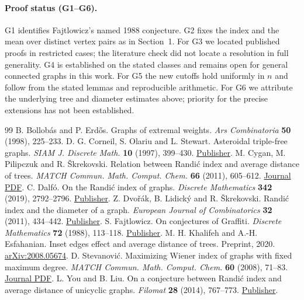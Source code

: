 \documentclass[11pt,a4paper]{article}
\begin{document}
\paragraph{Proof status (G1--G6).}
G1 identifies Fajtlowicz's named 1988 conjecture. G2 fixes the index and
the mean over distinct vertex pairs as in Section~1. For G3 we located
published proofs in restricted cases; the literature check did not locate
a resolution in full generality. G4 is established on the stated classes
and remains open for general connected graphs in this work. For G5 the
new cutoffs hold uniformly in $n$ and follow from the stated lemmas and
reproducible arithmetic. For G6 we attribute the underlying tree and
diameter estimates above; priority for the precise extensions has not
been established.
\begin{thebibliography}{99}
 B. Bollob\'as and P. Erd\H{o}s. Graphs of extremal weights.
\emph{Ars Combinatoria} \textbf{50} (1998), 225--233.
 D. G. Corneil, S. Olariu and L. Stewart.
Asteroidal triple-free graphs. \emph{SIAM J. Discrete Math.}
\textbf{10} (1997), 399--430.
\href{https://doi.org/10.1137/S0895480193250125}{Publisher}.
 M. Cygan, M. Pilipczuk and R. \v{S}krekovski.
Relation between Randi\'c index and average distance of trees.
\emph{MATCH Commun. Math. Comput. Chem.} \textbf{66} (2011), 605--612.
\href{https://match.pmf.kg.ac.rs/electronic_versions/Match66/n2/match66n2_605-612.pdf}{Journal PDF}.
 C. Dalf\'o. On the Randi\'c index of graphs.
\emph{Discrete Mathematics} \textbf{342} (2019), 2792--2796.
\href{https://doi.org/10.1016/j.disc.2018.08.020}{Publisher}.
 Z. Dvo\v{r}\'ak, B. Lidick\'y and R. \v{S}krekovski.
Randi\'c index and the diameter of a graph.
\emph{European Journal of Combinatorics} \textbf{32} (2011), 434--442.
\href{https://doi.org/10.1016/j.ejc.2010.12.002}{Publisher}.
 S. Fajtlowicz. On conjectures of Graffiti.
\emph{Discrete Mathematics} \textbf{72} (1988), 113--118.
\href{https://doi.org/10.1016/0012-365X(88)90199-9}{Publisher}.
 M. H. Khalifeh and A.-H. Esfahanian. Inset edges effect and
average distance of trees. Preprint, 2020.
\href{https://arxiv.org/abs/2008.05674}{arXiv:2008.05674}.
 D. Stevanovi\'c. Maximizing Wiener index of graphs with fixed
maximum degree. \emph{MATCH Commun. Math. Comput. Chem.} \textbf{60}
(2008), 71--83.
\href{https://match.pmf.kg.ac.rs/electronic_versions/Match60/n1/match60n1_71-83.pdf}{Journal PDF}.
 L. You and B. Liu. On a conjecture between Randi\'c index
and average distance of unicyclic graphs. \emph{Filomat} \textbf{28}
(2014), 767--773. \href{https://doi.org/10.2298/FIL1404767Y}{Publisher}.
\end{thebibliography}
\end{document}
